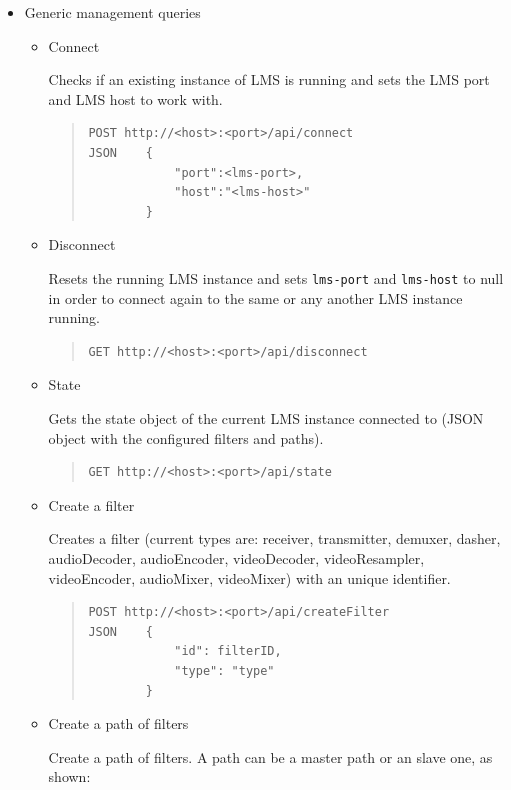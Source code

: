 \begin{itemize}
\item Generic management queries
\begin{itemize}
\item Connect \hfill

Checks if an existing instance of LMS is running and sets the LMS port and LMS host to work with.
\begin{quote}
\begin{verbatim}
POST http://<host>:<port>/api/connect
JSON    {
            "port":<lms-port>,
            "host":"<lms-host>"
        }
\end{verbatim}
\end{quote}
\item Disconnect \hfill

Resets the running LMS instance and sets \verb|lms-port| and \verb|lms-host| to null in order to connect again to the same or any another LMS instance running.
\begin{quote}
\begin{verbatim}
GET http://<host>:<port>/api/disconnect
\end{verbatim}
\end{quote}
\item State \hfill

Gets the state object of the current LMS instance connected to (JSON object with the configured filters and paths).
\begin{quote}
\begin{verbatim}
GET http://<host>:<port>/api/state
\end{verbatim}
\end{quote}
\item Create a filter \hfill

Creates a filter (current types are: receiver, transmitter, demuxer, dasher, audioDecoder, audioEncoder, videoDecoder, videoResampler, videoEncoder, audioMixer, videoMixer) with an unique identifier.
\begin{quote}
\begin{verbatim}
POST http://<host>:<port>/api/createFilter
JSON    {
            "id": filterID,
            "type": "type"
        }
\end{verbatim}
\end{quote}        
\item Create a path of filters \hfill

Create a path of filters. A path can be a master path or an slave one, as shown:


\end{itemize}
\end{itemize}
